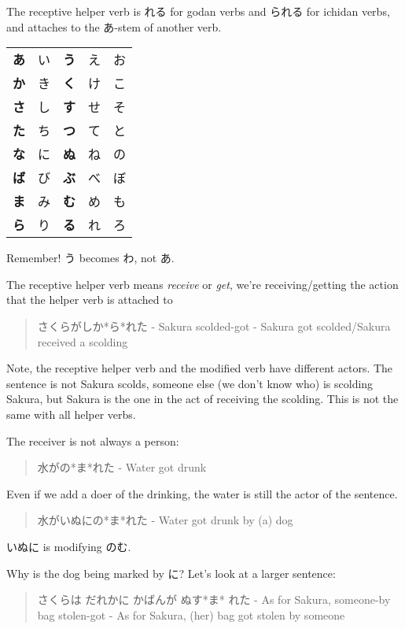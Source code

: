\documentclass[11pt]{article}
\begin{document}
The receptive helper verb is れる for godan verbs and られる for ichidan verbs, and attaches to the あ-stem of another verb.
\begin{center}
\begin{tabular}{lllll}
\textbf{あ} & い & \textbf{う} & え & お\\
\textbf{か} & き & \textbf{く} & け & こ\\
\textbf{さ} & し & \textbf{す} & せ & そ\\
\textbf{た} & ち & \textbf{つ} & て & と\\
\textbf{な} & に & \textbf{ぬ} & ね & の\\
\textbf{ば} & び & \textbf{ぶ} & べ & ぼ\\
\textbf{ま} & み & \textbf{む} & め & も\\
\textbf{ら} & り & \textbf{る} & れ & ろ\\
\end{tabular}
\end{center}
Remember! う becomes わ, not あ.

The receptive helper verb means \emph{receive} or \emph{get}, we're receiving/getting the action that the helper verb is attached to
\begin{quote}
さくらがしか*ら*れた - Sakura scolded-got - Sakura got scolded/Sakura received a scolding
\end{quote}

Note, the receptive helper verb and the modified verb have different actors. The sentence is not Sakura scolds, someone else (we don't know who) is scolding Sakura, but Sakura is the one in the act of receiving the scolding. This is not the same with all helper verbs.

The receiver is not always a person:
\begin{quote}
水がの*ま*れた - Water got drunk
\end{quote}
Even if we add a doer of the drinking, the water is still the actor of the sentence.
\begin{quote}
水がいぬにの*ま*れた - Water got drunk by (a) dog
\end{quote}
いぬに is modifying のむ.

Why is the dog being marked by に? Let's look at a larger sentence:
\begin{quote}
さくらは だれかに かばんが ぬす*ま* れた - As for Sakura, someone-by bag stolen-got - As for Sakura, (her) bag got stolen by someone
\end{quote}
\end{document}
